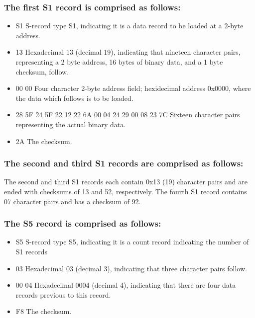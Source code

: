                 \subsubsection{The first S1 record is comprised as follows:}
                    \begin{itemize}
                        \item S1 S-record type S1, indicating it is a data record to be loaded at a 2-byte address.
                        \item 13 Hexadecimal 13 (decimal 19), indicating that nineteen character pairs, representing a 2 byte address, 16 bytes of binary data, and a 1 byte checksum, follow.
                        \item 00 00 Four character 2-byte address field; hexidecimal address 0x0000, where the data which follows is to be loaded.
                        \item 28 5F 24 5F 22 12 22 6A 00 04 24 29 00 08 23 7C Sixteen character pairs representing the actual binary data.
                        \item 2A The checksum.
                    \end{itemize}
                    
                \subsubsection{The second and third S1 records are comprised as follows:}
                
                    The second and third S1 records each contain 0x13 (19) character pairs
                    and are ended with checksums of 13 and 52, respectively. The fourth S1
                    record contains 07 character pairs and has a checksum of 92.

                \subsubsection{The S5 record is comprised as follows:}
                    \begin{itemize}
                        \item S5 S-record type S5, indicating it is a count record indicating the number of S1 records
                        \item 03 Hexadecimal 03 (decimal 3), indicating that three character pairs follow.
                        \item 00 04 Hexadecimal 0004 (decimal 4), indicating that there are four data records previous to this record.
                        \item F8 The checksum.
                    \end{itemize}
